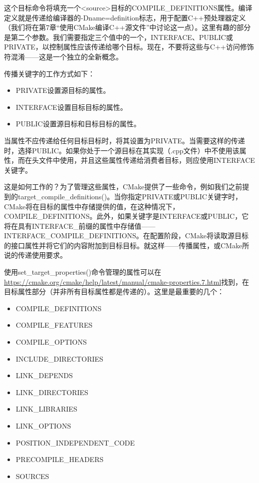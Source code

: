 这个目标命令将填充一个<source>目标的COMPILE\_DEFINITIONS属性。编译定义就是传递给编译器的-Dname=definition标志，用于配置C++预处理器定义（我们将在第7章“使用CMake编译C++源文件”中讨论这一点）。这里有趣的部分是第二个参数。我们需要指定三个值中的一个，INTERFACE、PUBLIC或PRIVATE，以控制属性应该传递给哪个目标。现在，不要将这些与C++访问修饰符混淆——这是一个独立的全新概念。

传播关键字的工作方式如下：

\begin{itemize}
\item
PRIVATE设置源目标的属性。

\item
INTERFACE设置目标目标的属性。

\item
PUBLIC设置源目标和目标目标的属性。
\end{itemize}

当属性不应传递给任何目标目标时，将其设置为PRIVATE。当需要这样的传递时，选择PUBLIC。如果你处于一个源目标在其实现（.cpp文件）中不使用该属性，而在头文件中使用，并且这些属性传递给消费者目标，则应使用INTERFACE关键字。

这是如何工作的？为了管理这些属性，CMake提供了一些命令，例如我们之前提到的target\_compile\_definitions()。当你指定PRIVATE或PUBLIC关键字时，CMake将在目标的属性中存储提供的值，在这种情况下，COMPILE\_DEFINITIONS。此外，如果关键字是INTERFACE或PUBLIC，它将在具有INTERFACE\_前缀的属性中存储值——INTERFACE\_COMPILE\_DEFINITIONS。在配置阶段，CMake将读取源目标的接口属性并将它们的内容附加到目标目标。就这样——传播属性，或CMake所说的传递使用要求。

使用set\_target\_properties()命令管理的属性可以在\url{https://cmake.org/cmake/help/latest/manual/cmake-properties.7.html}找到，在目标属性部分（并非所有目标属性都是传递的）。这里是最重要的几个：

\begin{itemize}
\item
COMPILE\_DEFINITIONS

\item
COMPILE\_FEATURES

\item
COMPILE\_OPTIONS

\item
INCLUDE\_DIRECTORIES

\item
LINK\_DEPENDS

\item
LINK\_DIRECTORIES

\item
LINK\_LIBRARIES

\item
LINK\_OPTIONS

\item
POSITION\_INDEPENDENT\_CODE

\item
PRECOMPILE\_HEADERS

\item
SOURCES
\end{itemize}


